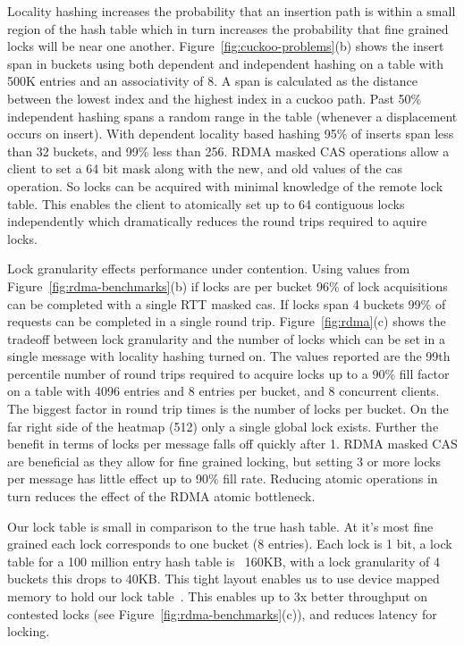 Locality hashing increases the probability that an insertion
path is within a small region of the hash table which in
turn increases the probability that fine grained locks will
be near one another. 
Figure~\ref{fig:cuckoo-problems}(b) shows the insert span in
buckets using both dependent and independent hashing on a
table with 500K entries and an associativity of 8. A span is
calculated as the distance between the lowest index and the
highest index in a cuckoo path. Past 50\% independent
hashing spans a random range in the table (whenever a
displacement occurs on insert). With dependent locality
based hashing 95\% of inserts span less than 32 buckets, and
99\% less than 256.
RDMA masked CAS operations allow a client to set a 64 bit
mask along with the new, and old values of the cas
operation. So locks can be acquired with minimal knowledge
of the remote lock table. This enables the client to
atomically set up to 64 contiguous locks independently which
dramatically reduces the round trips required to aquire
locks.

Lock granularity effects performance under contention. Using
values from Figure~\ref{fig:rdma-benchmarks}(b) if locks are
per bucket 96\% of lock acquisitions can be completed with a
single RTT masked cas. If locks span 4 buckets 99\% of
requests can be completed in a single round trip.
Figure~\ref{fig:rdma}(c) shows the tradeoff between lock
granularity and the number of locks which can be set in a
single message with locality hashing turned on. The values
reported are the 99th percentile number of round trips
required to acquire locks up to a 90\% fill factor on a
table with 4096 entries and 8 entries per bucket, and 8
concurrent clients. The biggest factor in round trip times
is the number of locks per bucket. On the far right side of
the heatmap (512) only a single global lock exists. Further
the benefit in terms of locks per message falls off quickly
after 1. RDMA masked CAS are beneficial as they allow for
fine grained locking, but setting 3 or more locks per
message has little effect up to 90\% fill rate. Reducing
atomic operations in turn reduces the effect of the RDMA
atomic bottleneck.

Our lock table is small in comparison to the true hash
table. At it's most fine grained each lock corresponds to
one bucket (8 entries). Each lock is 1 bit, a lock table for
a 100 million entry hash table is ~160KB, with a lock
granularity of 4 buckets this drops to 40KB. This tight
layout enables us to use device mapped memory to hold our
lock table~\cite{design-guidelines,sherman}. This enables up
to 3x better throughput on contested locks (see
Figure~\ref{fig:rdma-benchmarks}(c)), and reduces latency
for locking.

